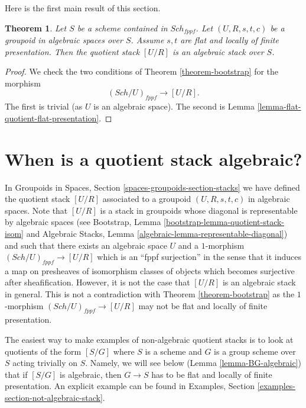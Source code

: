 \documentclass{stacks-project}
\theoremstyle{plain}
\newtheorem{theorem}[subsection]{Theorem}
\theoremstyle{definition}
\theoremstyle{remark}
\numberwithin{equation}{subsection}
\def\Sch{\mathit{Sch}}
\begin{document}
\noindent
Here is the first main result of this section.

\begin{theorem}
\label{theorem-flat-groupoid-gives-algebraic-stack}
Let $S$ be a scheme contained in $\Sch_{fppf}$.
Let $(U, R, s, t, c)$ be a groupoid in algebraic spaces over $S$.
Assume $s, t$ are flat and locally of finite presentation.
Then the quotient stack $[U/R]$ is an algebraic stack over $S$.
\end{theorem}

\begin{proof}
We check the two conditions of
Theorem \ref{theorem-bootstrap}
for the morphism
$$
(\Sch/U)_{fppf} \longrightarrow [U/R].
$$
The first is trivial (as $U$ is an algebraic space).
The second is
Lemma \ref{lemma-flat-quotient-flat-presentation}.
\end{proof}









\section{When is a quotient stack algebraic?}
\label{section-quotient-algebraic}

\noindent
In
Groupoids in Spaces, Section \ref{spaces-groupoids-section-stacks}
we have defined the quotient stack $[U/R]$ associated to a groupoid
$(U, R, s, t, c)$ in algebraic spaces. Note that $[U/R]$ is a stack
in groupoids whose diagonal is representable by algebraic spaces (see
Bootstrap, Lemma \ref{bootstrap-lemma-quotient-stack-isom}
and
Algebraic Stacks, Lemma \ref{algebraic-lemma-representable-diagonal})
and such that there exists an algebraic space $U$ and a $1$-morphism
$(\Sch/U)_{fppf} \to [U/R]$ which is an ``fppf surjection''
in the sense that it induces a map on presheaves of isomorphism classes of
objects which becomes surjective after sheafification.
However, it is not the case that $[U/R]$ is an algebraic
stack in general. This is not a contradiction with
Theorem \ref{theorem-bootstrap}
as the $1$-morphism $(\Sch/U)_{fppf} \to [U/R]$ may not
be flat and locally of finite presentation.

\medskip\noindent
The easiest way to make examples of non-algebraic quotient stacks is
to look at quotients of the form $[S/G]$ where $S$ is a scheme and $G$
is a group scheme over $S$ acting trivially on $S$. Namely, we will see
below
(Lemma \ref{lemma-BG-algebraic})
that if $[S/G]$ is algebraic, then $G \to S$ has to be flat and locally
of finite presentation. An explicit example can be found in
Examples, Section \ref{examples-section-not-algebraic-stack}.
\end{document}
